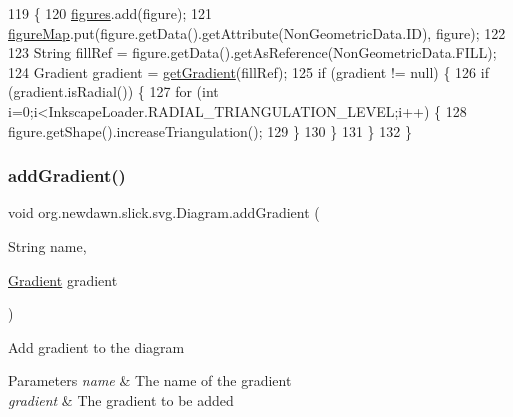 \begin{DoxyCode}
119                                          \{
120         \mbox{\hyperlink{classorg_1_1newdawn_1_1slick_1_1svg_1_1_diagram_aaddbe68bc0b0c847583aa35d530aba2f}{figures}}.add(figure);
121         \mbox{\hyperlink{classorg_1_1newdawn_1_1slick_1_1svg_1_1_diagram_a71c079c584be2e55632123b9b2d939ad}{figureMap}}.put(figure.getData().getAttribute(NonGeometricData.ID), figure);
122         
123         String fillRef = figure.getData().getAsReference(NonGeometricData.FILL);
124         Gradient gradient = \mbox{\hyperlink{classorg_1_1newdawn_1_1slick_1_1svg_1_1_diagram_a13c8069cc4608b5f12fdab9586793d64}{getGradient}}(fillRef);
125         \textcolor{keywordflow}{if} (gradient != null) \{
126             \textcolor{keywordflow}{if} (gradient.isRadial()) \{
127                 \textcolor{keywordflow}{for} (\textcolor{keywordtype}{int} i=0;i<InkscapeLoader.RADIAL\_TRIANGULATION\_LEVEL;i++) \{
128                     figure.getShape().increaseTriangulation();
129                 \}
130             \}
131         \}
132     \}
\end{DoxyCode}
\mbox{\label{classorg_1_1newdawn_1_1slick_1_1svg_1_1_diagram_a53cfd1607b66ba8cf8ebc6d2417f7b41}} 
\subsubsection{\texorpdfstring{add\+Gradient()}{addGradient()}}
{\footnotesize\ttfamily void org.\+newdawn.\+slick.\+svg.\+Diagram.\+add\+Gradient (\begin{DoxyParamCaption}\item[{String}]{name,  }\item[{\mbox{\hyperlink{classorg_1_1newdawn_1_1slick_1_1svg_1_1_gradient}{Gradient}}}]{gradient }\end{DoxyParamCaption})\hspace{0.3cm}{\ttfamily [inline]}}

Add gradient to the diagram


\begin{DoxyParams}{Parameters}
{\em name} & The name of the gradient \\
\hline
{\em gradient} & The gradient to be added \\
\hline
\end{DoxyParams}

